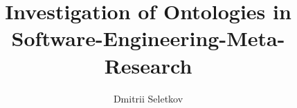 \documentclass[oneside, english]{sdqseminar}
\author{Dmitrii Seletkov}
\title{Investigation of Ontologies in Software-Engineering-Meta-Research}
\begin{document}
\setpdf

\maketitle

 

\begin{abstract}

\end{abstract}







\printbibliography
\end{document}
